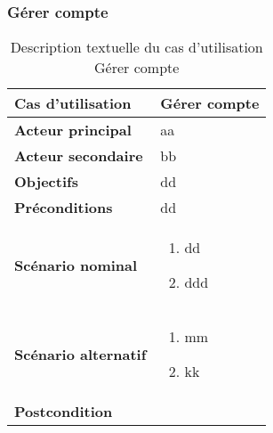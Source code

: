         \subsubsection[Gérer compte]{Gérer compte}
        \begin{longtable}{p{4cm} p{9cm}}
            \caption{Description textuelle du cas d’utilisation Gérer compte}
            \label{table:usecaseGereCompte}
            \\\hline\hline
                \textbf{Cas d’utilisation} & \textbf{Gérer compte}
            \\\hline\hline
                    \textbf{Acteur principal} & aa
                \\
                    \textbf{Acteur secondaire} & bb
                \\
                    \textbf{Objectifs} & dd
                \\
                    \textbf{Préconditions} & dd
                \\
                \textbf{Scénario nominal} &
                    \begin{enumerate}[leftmargin=*]
                        \item dd
                        \item ddd
                    \end{enumerate}
                \\
                \textbf{Scénario alternatif} &
                    \begin{enumerate}[leftmargin=*]
                        \item mm
                        \item kk
                    \end{enumerate}
                \\
                \textbf{Postcondition}
            \\\bottomrule
        \end{longtable}


